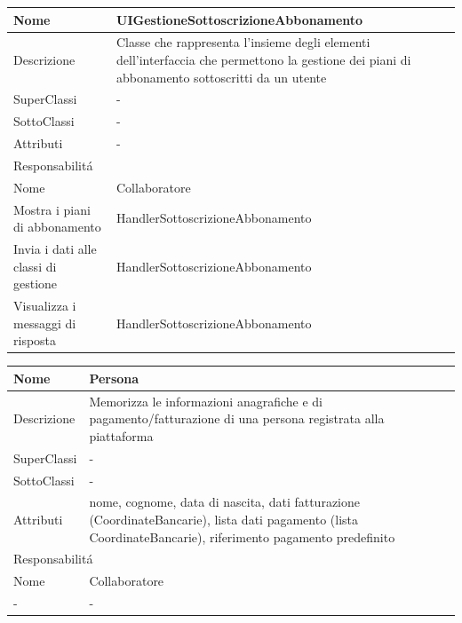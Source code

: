 \begin{center}
    \begin{longtable}{ |p{3cm}|p{3cm}|p{3cm}|p{3cm}| }
        \hline
        Nome & \multicolumn{3}{|p{9cm}|}{UIGestioneSottoscrizioneAbbonamento} \\\hline
        Descrizione & \multicolumn{3}{|p{9cm}|}{Classe che rappresenta l'insieme degli elementi dell'interfaccia che permettono la gestione dei piani di abbonamento sottoscritti da un utente} \\\hline
        SuperClassi & \multicolumn{3}{|p{9cm}|}{-} \\\hline
        SottoClassi & \multicolumn{3}{|p{9cm}|}{-} \\\hline
        Attributi & \multicolumn{3}{|p{9cm}|}{-} \\\hline
        \multicolumn{4}{|p{12cm}|}{Responsabilit\'a} \\\hline
        \multicolumn{2}{|p{5cm}|}{Nome} & \multicolumn{2}{|p{7cm}|}{Collaboratore} \\\hline
        \multicolumn{2}{|p{5cm}|}{Mostra i piani di abbonamento} & \multicolumn{2}{|p{7cm}|}{HandlerSottoscrizioneAbbonamento} \\\hline
        \multicolumn{2}{|p{5cm}|}{Invia i dati alle classi di gestione} & \multicolumn{2}{|p{7cm}|}{HandlerSottoscrizioneAbbonamento} \\\hline
        \multicolumn{2}{|p{5cm}|}{Visualizza i messaggi di risposta} & \multicolumn{2}{|p{7cm}|}{HandlerSottoscrizioneAbbonamento} \\\hline
    \end{longtable}
\end{center}

\begin{center} %
    \begin{longtable}{ |p{3cm}|p{3cm}|p{3cm}|p{3cm}| }
        \hline
        Nome & \multicolumn{3}{|p{9cm}|}{Persona} \\\hline
        Descrizione & \multicolumn{3}{|p{9cm}|}{Memorizza le informazioni anagrafiche e di pagamento/fatturazione di una persona registrata alla piattaforma} \\\hline
        SuperClassi & \multicolumn{3}{|p{9cm}|}{-} \\\hline
        SottoClassi & \multicolumn{3}{|p{9cm}|}{-} \\\hline
        Attributi & \multicolumn{3}{|p{9cm}|}{nome, cognome, data di nascita, dati fatturazione (CoordinateBancarie), lista dati pagamento (lista CoordinateBancarie), riferimento pagamento predefinito} \\\hline
        \multicolumn{4}{|p{12cm}|}{Responsabilit\'a} \\\hline %
        \multicolumn{2}{|p{6cm}|}{Nome} & \multicolumn{2}{|p{6cm}|}{Collaboratore} \\\hline %
        \multicolumn{2}{|p{6cm}|}{-} & \multicolumn{2}{|p{6cm}|}{-} \\\hline
    \end{longtable}
\end{center}

